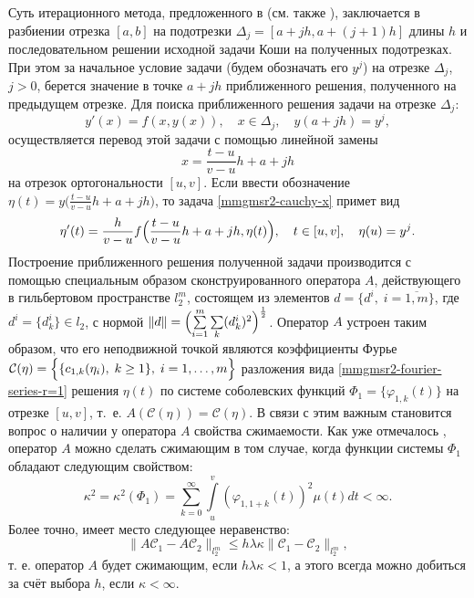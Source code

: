 Суть итерационного метода, предложенного в \cite{mmgmsr2-SHII-Demi2017-ODESystems} (см. также \cite{mmgmsr2-SHII-MMG-Demi2017-CosOde}), заключается в разбиении отрезка $[a,b]$ на подотрезки $\Delta_j=[a+jh,a+(j+1)h]$ длины $h$ и последовательном решении исходной задачи Коши на полученных подотрезках.
При этом за начальное условие задачи (будем обозначать его $y^j$) на отрезке $\Delta_j$, $j>0$, берется значение в точке $a+jh$ приближенного решения, полученного на предыдущем отрезке. Для поиска приближенного решения задачи на отрезке $\Delta_j$:
\begin{equation}\label{mmgmsr2-cauchy-x}
y'(x)=f(x,y(x)), \quad x \in \Delta_j, \quad y(a+jh)=y^j,
\end{equation}
осуществляется перевод этой задачи с помощью линейной замены
\begin{equation*}
x=\frac{t-u}{v-u}h+a+jh
\end{equation*}
на отрезок ортогональности $[u,v]$. Если ввести обозначение $\eta(t)=y\bigl(\frac{t-u}{v-u}h+a+jh\bigr)$, то задача \eqref{mmgmsr2-cauchy-x} примет вид
\begin{equation}\label{mmgmsr2-cauchy-problem-eta}
\eta'(t)=\frac{h}{v-u}f\Bigl(\frac{t-u}{v-u}h+a+jh,\eta(t)\Bigr), \quad t \in [u,v], \quad \eta(u)=y^j.
\end{equation}
Построение приближенного решения полученной задачи производится с помощью специальным образом сконструированного оператора $A$, действующего в гильбертовом пространстве $l^m_2$, состоящем из элементов $d=\{d^i,\; i=\overline{1,m}\}$, где $d^i=\{d^i_k\} \in l_2$, с нормой $\|d\|=\Bigl(\sum\limits_{i=1}^m \sum\limits_{k} (d_k^i)^2\Bigr)^{\frac{1}{2}}$.
Оператор $A$ устроен таким образом, что его неподвижной точкой являются коэффициенты Фурье $\mathcal{C}(\eta)=\Bigl\{ \{c_{1,k}(\eta_i), \; k \ge 1 \}, \; i = 1, \ldots, m \Bigr\}$ разложения вида \eqref{mmgmsr2-fourier-series-r=1} решения $\eta(t)$ по системе соболевских функций $\Phi_1=\{\varphi_{1,k}(t)\}$ на отрезке $[u,v]$, т.~е. $A(\mathcal{C}(\eta))=\mathcal{C}(\eta)$.
В связи с этим важным становится вопрос о наличии у оператора $A$ свойства сжимаемости.
Как уже отмечалось \cite{mmgmsr2-SHII-Demi2017-ODESystems}, оператор $A$ можно сделать сжимающим в том случае, когда функции системы $\Phi_1$ обладают следующим свойством:
\begin{equation}\label{mmgmsr2-finite-sum-prop}
\kappa^2=\kappa^2(\Phi_1)=
\sum\limits_{k=0}^{\infty}
\int\limits_{u}^{v}
(\varphi_{1,1+k}(t))^2 \mu(t)dt < \infty.
\end{equation}
Более точно, имеет место следующее неравенство:
\begin{equation*}
\|A\mathcal{C}_1 - A\mathcal{C}_2\|_{l_2^m} \le h \lambda \kappa \|\mathcal{C}_1-\mathcal{C}_2\|_{l_2^m},
\end{equation*}
т. е. оператор $A$ будет сжимающим, если $h \lambda \kappa < 1$, а этого всегда можно добиться за счёт выбора $h$, если $\kappa < \infty$.

